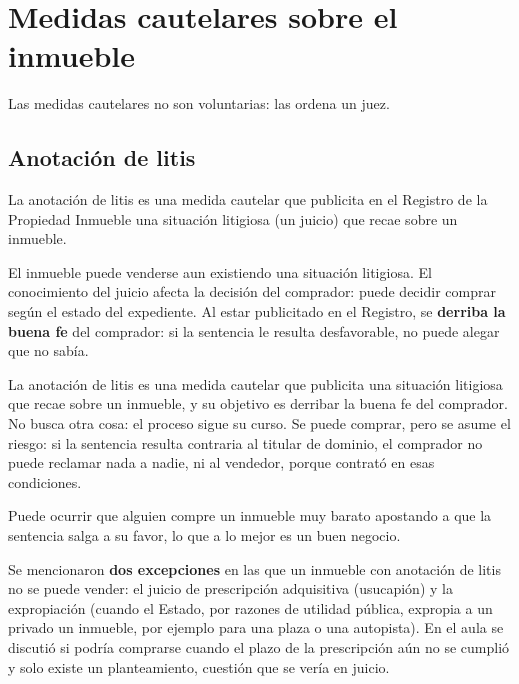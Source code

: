 \documentclass[12pt,oneside]{book}
\begin{document}
\chapter{Medidas cautelares sobre el inmueble}

Las medidas cautelares no son voluntarias: las ordena un juez.

\section{Anotación de litis}

La anotación de litis es una medida cautelar que publicita en el Registro de la Propiedad Inmueble una situación litigiosa (un juicio) que recae sobre un inmueble.

El inmueble puede venderse aun existiendo una situación litigiosa. El conocimiento del juicio afecta la decisión del comprador: puede decidir comprar según el estado del expediente. Al estar publicitado en el Registro, se \textbf{derriba la buena fe} del comprador: si la sentencia le resulta desfavorable, no puede alegar que no sabía.

\begin{important}
La anotación de litis es una medida cautelar que publicita una situación litigiosa que recae sobre un inmueble, y su objetivo es derribar la buena fe del comprador. No busca otra cosa: el proceso sigue su curso. Se puede comprar, pero se asume el riesgo: si la sentencia resulta contraria al titular de dominio, el comprador no puede reclamar nada a nadie, ni al vendedor, porque contrató en esas condiciones.
\end{important}

Puede ocurrir que alguien compre un inmueble muy barato apostando a que la sentencia salga a su favor, lo que a lo mejor es un buen negocio.

Se mencionaron \textbf{dos excepciones} en las que un inmueble con anotación de litis no se puede vender: el juicio de prescripción adquisitiva (usucapión) y la expropiación (cuando el Estado, por razones de utilidad pública, expropia a un privado un inmueble, por ejemplo para una plaza o una autopista). En el aula se discutió si podría comprarse cuando el plazo de la prescripción aún no se cumplió y solo existe un planteamiento, cuestión que se vería en juicio. %
\end{document}
